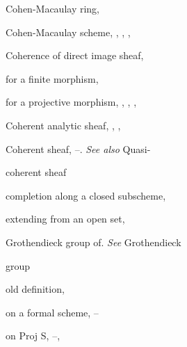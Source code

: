 {{\noindent\hspace*{0.0bp}Cohen-Macaulay ring, \par
\noindent\hspace*{0.0bp}Cohen-Macaulay scheme, , , ,\par
\noindent\hspace*{15.0bp}\par
\noindent\hspace*{0.0bp}Coherence of direct image sheaf, \par
\noindent\hspace*{7.5bp}for a finite morphism, \par
\noindent\hspace*{7.5bp}for a projective morphism, , , ,\par
\noindent\hspace*{15.0bp}\par
\noindent\hspace*{0.0bp}Coherent analytic sheaf, , , \par
\noindent\hspace*{0.0bp}Coherent sheaf, --. \emph{See also} Quasi-\par
\noindent\hspace*{15.0bp}coherent sheaf\par
\noindent\hspace*{7.5bp}completion along a closed subscheme,\par
\noindent\hspace*{15.0bp}\par
\noindent\hspace*{7.5bp}extending from an open set, \par
\noindent\hspace*{7.5bp}Grothendieck group of. \emph{See} Grothendieck\par
\noindent\hspace*{15.0bp}group\par
\noindent\hspace*{7.5bp}old definition, \par
\noindent\hspace*{7.5bp}on a formal scheme, --\par
\noindent\hspace*{7.5bp}on Proj S, --, \par
}}
